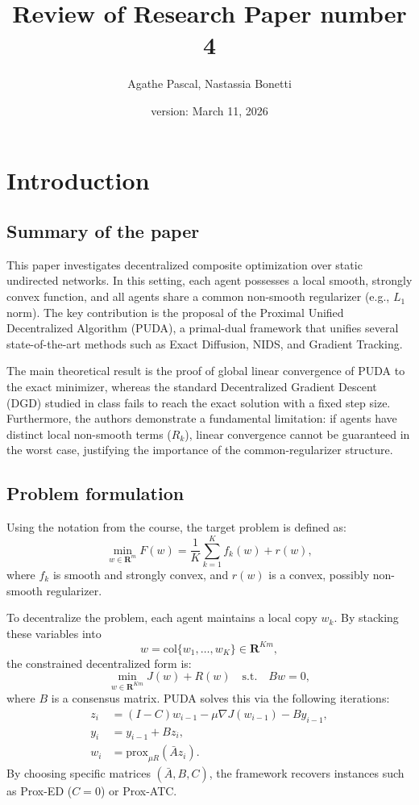 \documentclass[10pt,english]{article}
\title{Review of Research Paper number 4}
\date{version: March 11, 2026}
\author{Agathe Pascal, Nastassia Bonetti}
\newcommand{\reals}{\mathbf{R}}
\begin{document}
\maketitle

\section{Introduction}

\subsection{Summary of the paper}

This paper investigates decentralized composite optimization over static undirected networks.
In this setting, each agent possesses a local smooth, strongly convex function, and all agents share a common non-smooth regularizer (e.g., $L_1$ norm).
The key contribution is the proposal of the Proximal Unified Decentralized Algorithm (PUDA), a primal-dual framework that unifies several state-of-the-art methods such as Exact Diffusion, NIDS, and Gradient Tracking.

The main theoretical result is the proof of global linear convergence of PUDA to the exact minimizer, whereas the standard Decentralized Gradient Descent (DGD) studied in class fails to reach the exact solution with a fixed step size.
Furthermore, the authors demonstrate a fundamental limitation: if agents have distinct local non-smooth terms ($R_k$), linear convergence cannot be guaranteed in the worst case, justifying the importance of the common-regularizer structure.

\subsection{Problem formulation}

Using the notation from the course, the target problem is defined as:
\[
\min_{w \in \reals^m} F(w) = \frac{1}{K}\sum_{k=1}^K f_k(w) + r(w),
\]
where $f_k$ is smooth and strongly convex, and $r(w)$ is a convex, possibly non-smooth regularizer.

To decentralize the problem, each agent maintains a local copy $w_k$.
By stacking these variables into
\[
w = \mathrm{col}\{w_1, \ldots, w_K\} \in \reals^{Km},
\]
the constrained decentralized form is:
\[
\min_{w \in \reals^{Km}} J(w) + R(w) \quad \text{s.t.} \quad Bw = 0,
\]
where $B$ is a consensus matrix.
PUDA solves this via the following iterations:
\begin{align*}
z_i &= (I-C)w_{i-1} - \mu \nabla J(w_{i-1}) - By_{i-1},\\
y_i &= y_{i-1} + Bz_i,\\
w_i &= \mathrm{prox}_{\mu R}(\bar A z_i).
\end{align*}
By choosing specific matrices $(\bar A, B, C)$, the framework recovers instances such as Prox-ED ($C=0$) or Prox-ATC.
\end{document}

